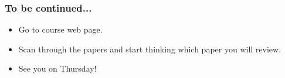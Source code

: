 \documentclass[handout]{beamer}
\begin{document}
\begin{frame}
\frametitle{To be continued...}
\begin{itemize}
\item Go to course web page.
\item Scan through the papers and start thinking which paper you will review.
\item See you on Thursday!
\end{itemize}
\end{frame}
\end{document}
